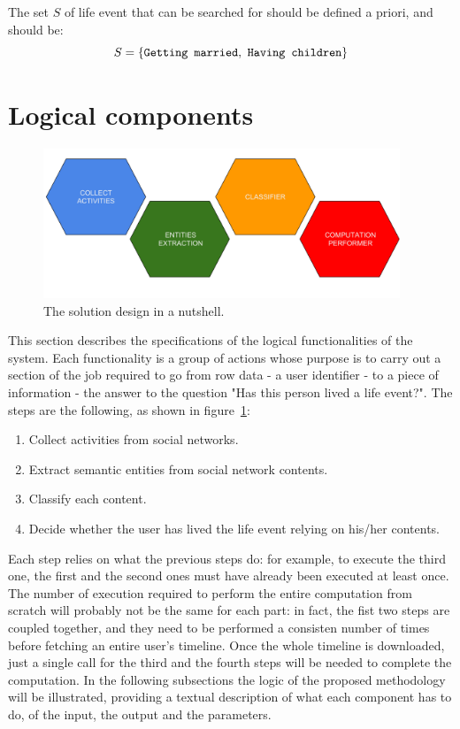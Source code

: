 The set $S$ of life event that can be searched for should be defined a priori, and should be: 
\[
S = \{\text{\texttt{Getting married}}, \text{ \texttt{Having children}}\}
\]

\section{Logical components}
\label{sec:logicdescr}

\begin{figure}[b]
\centering
\includegraphics[width=%
0.95\textwidth]{img/Solutiondesign_nutshell}
\caption{The solution design in a nutshell.}
\label{fig:nutshell}
\end{figure}

This section describes the specifications of the logical functionalities of the system. Each functionality is a group of actions whose purpose is to carry out a section of the job required to go from row data - a user identifier - to a piece of information - the answer to the question "Has this person lived a life event?". The steps are the following, as shown in figure~\ref{fig:nutshell}:
\begin{enumerate}
\item Collect activities from social networks.
\item Extract semantic entities from social network contents.
\item Classify each content.
\item Decide whether the user has lived the life event relying on his/her contents.
\end{enumerate}
Each step relies on what the previous steps do: for example, to execute the third one, the first and the second ones must have already been executed at least once. The number of execution required to perform the entire computation from scratch will probably not be the same for each part: in fact, the fist two steps are coupled together, and they need to be performed a consisten number of times before fetching an entire user's timeline. Once the whole timeline is downloaded, just a single call for the third and the fourth steps will be needed to complete the computation. In the following subsections the logic of the proposed methodology will be illustrated, providing a textual description of what each component has to do, of the input, the output and the parameters. 

